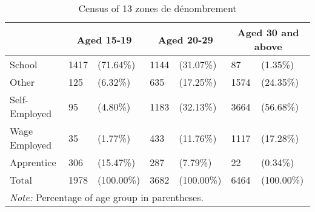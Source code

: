 \begin{table}[htbp]\centering
\def\sym#1{\ifmmode^{#1}\else\(^{#1}\)\fi}
\caption{Census of 13 zones de dénombrement \label{tab:tbl-census}}
\begin{tabular}{l*{3}{ll}}
\toprule
            &\multicolumn{2}{c}{Aged 15-19}&\multicolumn{2}{c}{Aged 20-29}&\multicolumn{2}{c}{Aged 30 and above}\\
\midrule
School      &        1417&     (71.64\%)&        1144&     (31.07\%)&          87&      (1.35\%)\\
Other       &         125&      (6.32\%)&         635&     (17.25\%)&        1574&     (24.35\%)\\
Self-Employed&          95&      (4.80\%)&        1183&     (32.13\%)&        3664&     (56.68\%)\\
Wage Employed&          35&      (1.77\%)&         433&     (11.76\%)&        1117&     (17.28\%)\\
Apprentice  &         306&     (15.47\%)&         287&      (7.79\%)&          22&      (0.34\%)\\
Total       &        1978&    (100.00\%)&        3682&    (100.00\%)&        6464&    (100.00\%)\\
\bottomrule
\multicolumn{7}{l}{\footnotesize \textit{Note:} Percentage of age group in parentheses.}\\
\end{tabular}
\end{table}
